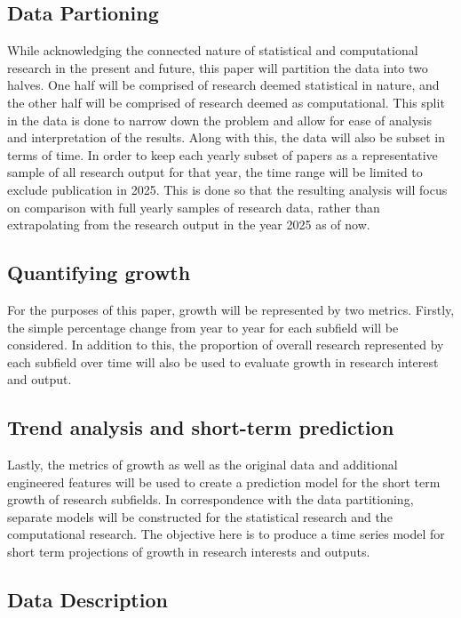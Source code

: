 \documentclass[
  12pt]{article}
\begin{document}
\subsection{Data Partioning}\label{data-partioning}

While acknowledging the connected nature of statistical and
computational research in the present and future, this paper will
partition the data into two halves. One half will be comprised of
research deemed statistical in nature, and the other half will be
comprised of research deemed as computational. This split in the data is
done to narrow down the problem and allow for ease of analysis and
interpretation of the results. Along with this, the data will also be
subset in terms of time. In order to keep each yearly subset of papers
as a representative sample of all research output for that year, the
time range will be limited to exclude publication in 2025. This is done
so that the resulting analysis will focus on comparison with full yearly
samples of research data, rather than extrapolating from the research
output in the year 2025 as of now.

\subsection{Quantifying growth}\label{quantifying-growth}

For the purposes of this paper, growth will be represented by two
metrics. Firstly, the simple percentage change from year to year for
each subfield will be considered. In addition to this, the proportion of
overall research represented by each subfield over time will also be
used to evaluate growth in research interest and output.

\subsection{Trend analysis and short-term
prediction}\label{trend-analysis-and-short-term-prediction}

Lastly, the metrics of growth as well as the original data and
additional engineered features will be used to create a prediction model
for the short term growth of research subfields. In correspondence with
the data partitioning, separate models will be constructed for the
statistical research and the computational research. The objective here
is to produce a time series model for short term projections of growth
in research interests and outputs.

\subsection{Data Description}\label{data-description}
\end{document}
